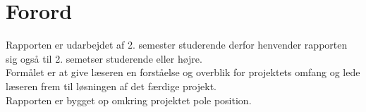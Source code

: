 \renewcommand{\abstractname}{Forord}
\section{Forord}
Rapporten er udarbejdet af 2. semester studerende derfor henvender rapporten sig også til 2. semetser studerende eller højre. \\
Formålet er at give læseren en forståelse og overblik for projektets omfang og lede læseren frem til løsningen af det færdige projekt.\\
Rapporten er bygget op omkring projektet pole position.\\ 

